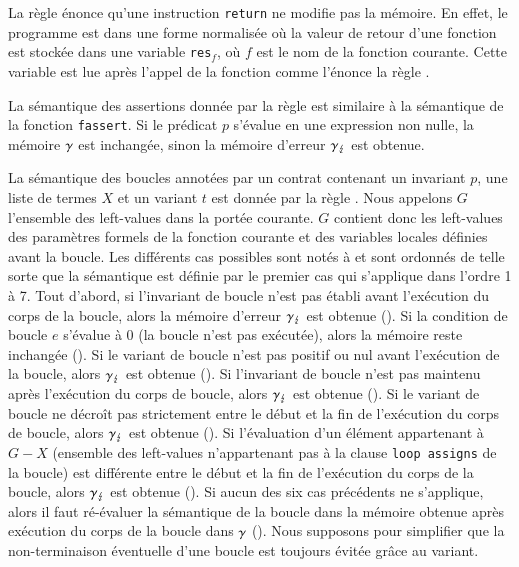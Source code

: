 La règle  énonce qu'une instruction \lstinline'return' ne
modifie pas la mémoire.
En effet, le programme est dans une forme normalisée où la valeur de retour
d'une fonction est stockée dans une variable \lstinline'res'$_f$, où
$f$ est le nom de la fonction courante.
Cette variable est lue après l'appel de la fonction comme l'énonce la règle
.

La sémantique des assertions \eacsl donnée par la règle  est
similaire à la sémantique de la fonction \lstinline'fassert'.
Si le prédicat $p$ s'évalue en une expression non nulle,
la mémoire $\gamma$ est inchangée, sinon la mémoire d'erreur $\gamma_\lightning$ est
obtenue.

La sémantique des boucles annotées par un contrat contenant un invariant
$p$, une liste de termes $X$ et un variant $t$ est
donnée par la règle .
Nous appelons $G$ l'ensemble des left-values dans la portée courante.
$G$ contient donc les left-values des paramètres formels de la fonction
courante et des variables locales définies avant la boucle.
Les différents cas possibles sont notés  à
 et sont ordonnés de telle sorte que la sémantique est
définie par le premier cas qui s'applique dans l'ordre 1 à 7.
Tout d'abord, si l'invariant de boucle n'est pas établi avant l'exécution du
corps de la boucle, alors la mémoire d'erreur $\gamma_\lightning$ est obtenue
().
Si la condition de boucle $e$ s'évalue à $0$ (la boucle n'est pas exécutée),
alors la mémoire reste inchangée ().
Si le variant de boucle n'est pas positif ou nul avant l'exécution de la boucle,
alors $\gamma_\lightning$ est obtenue ().
Si l'invariant de boucle n'est pas maintenu après l'exécution du corps de
boucle, alors $\gamma_\lightning$ est obtenue ().
Si le variant de boucle ne décroît pas strictement entre le début et la fin de
l'exécution du corps de boucle, alors $\gamma_\lightning$ est obtenue
().
Si l'évaluation d'un élément appartenant à $G-X$ (ensemble des left-values
n'appartenant pas à la clause \lstinline'loop assigns' de la boucle) est
différente entre le début et la fin de l'exécution du corps de la boucle, alors
$\gamma_\lightning$ est obtenue ().
Si aucun des six cas précédents ne s'applique, alors il faut ré-évaluer la
sémantique de la boucle dans la mémoire obtenue après exécution du corps de la
boucle dans $\gamma$ ().
Nous supposons pour simplifier que la non-terminaison éventuelle d'une boucle
est toujours évitée grâce au variant.


